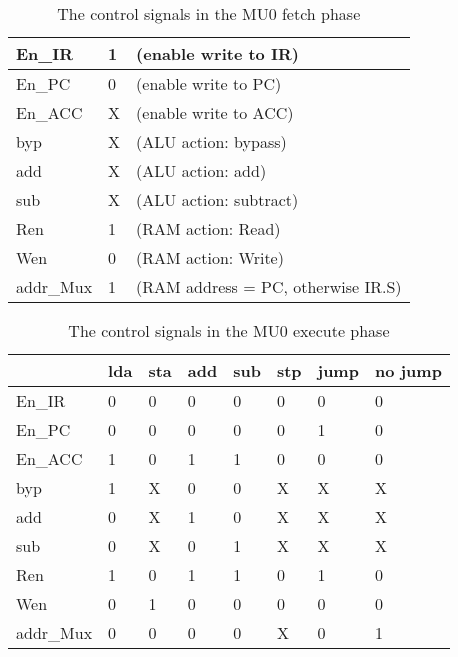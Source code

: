 \begin{table}[!ht]
  \centering
    \begin{tabular}{|l|l|l|}\hline
    En\_IR  & 1 &(enable write to IR)\\ \hline
    En\_PC  & 0 &(enable write to PC)\\ \hline
    En\_ACC & X &(enable write to ACC)\\ \hline
    \hline
    byp & X &(ALU action: bypass)\\ \hline
    add & X &(ALU action: add)\\ \hline
    sub & X &(ALU action: subtract)\\ \hline
    \hline
    Ren & 1 &(RAM action: Read)\\ \hline
    Wen & 0 &(RAM action: Write)\\ \hline
    addr\_Mux& 1  &(RAM address = PC, otherwise IR.S)\\ \hline
  \end{tabular}
  \caption{The control signals in the MU0 fetch phase}
  \label{lab:1:fetch}
\end{table}

\begin{table}[!ht]
  \centering
  \begin{tabular}{|l|l|l|l|l|l|l|l|}\hline
      & lda & sta & add & sub & stp & jump  & no jump\\ \hline
    \hline
    En\_IR   & 0  & 0 & 0 & 0 & 0 & 0 & 0 \\ \hline
    En\_PC   & 0  & 0 & 0 & 0 & 0 & 1 & 0 \\ \hline
    En\_ACC  & 1  & 0 & 1 & 1 & 0 & 0 & 0 \\ \hline
    \hline
    byp      & 1  & X & 0 & 0 & X & X & X \\ \hline
    add      & 0  & X & 1 & 0 & X & X & X \\ \hline
    sub      & 0  & X & 0 & 1 & X & X & X \\ \hline
    \hline
    Ren      & 1  & 0 & 1 & 1 & 0 & 1 & 0 \\ \hline
    Wen      & 0  & 1 & 0 & 0 & 0 & 0 & 0 \\ \hline
    addr\_Mux& 0  & 0 & 0 & 0 & X & 0 & 1 \\ \hline
  \end{tabular}
  \caption{The control signals in the MU0 execute phase}
  \label{lab:1:execute}
\end{table}